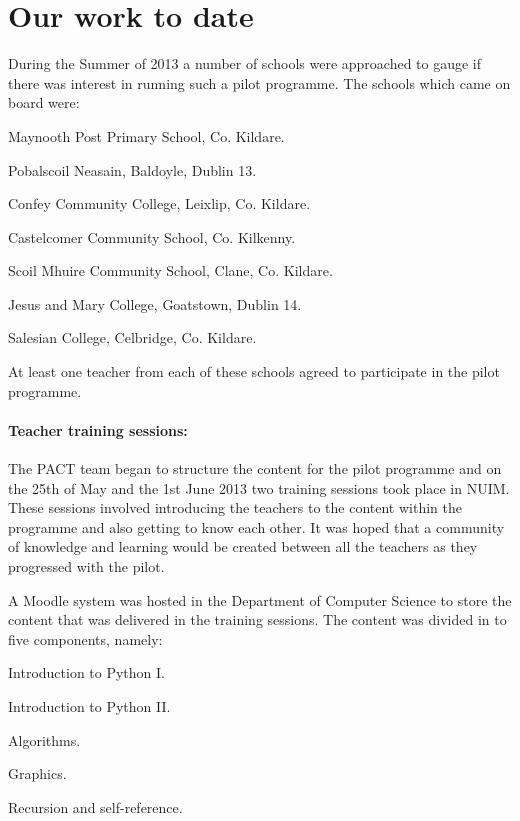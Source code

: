 \documentclass[a4paper]{article}
\begin{document}
\section{Our work to date} \label{sect:OurWork}
During the Summer of 2013 a number of schools were approached to gauge if there was interest in running such a pilot programme. The schools which came on board were:
\begin{compactitem}
  \item Maynooth Post Primary School, Co. Kildare.
  \item Pobalscoil Neasain, Baldoyle, Dublin 13.
  \item Confey Community College, Leixlip, Co. Kildare.
  \item Castelcomer Community School, Co. Kilkenny.
  \item Scoil Mhuire Community School, Clane, Co. Kildare.
  \item Jesus and Mary College, Goatstown, Dublin 14.
  \item Salesian College, Celbridge, Co. Kildare.
\end{compactitem}

At least one teacher from each of these schools agreed to participate in the pilot programme. 

\paragraph{Teacher training sessions:}
The PACT team began to structure the content for the pilot programme and on the 25th of May and the 1st June 2013 two training sessions took place in NUIM. These sessions involved introducing the teachers to the content within the programme and also getting to know each other. It was hoped that a community of knowledge and learning would be created between all the teachers as they progressed with the pilot.

A Moodle system was hosted in the Department of Computer Science to store the content that was delivered in the training sessions. The content was divided in to five components, namely:

\begin{compactenum}
  \item Introduction to Python I.
  \item Introduction to Python II.
  \item Algorithms.
  \item Graphics.
  \item Recursion and self-reference.
\end{compactenum}
\end{document}
